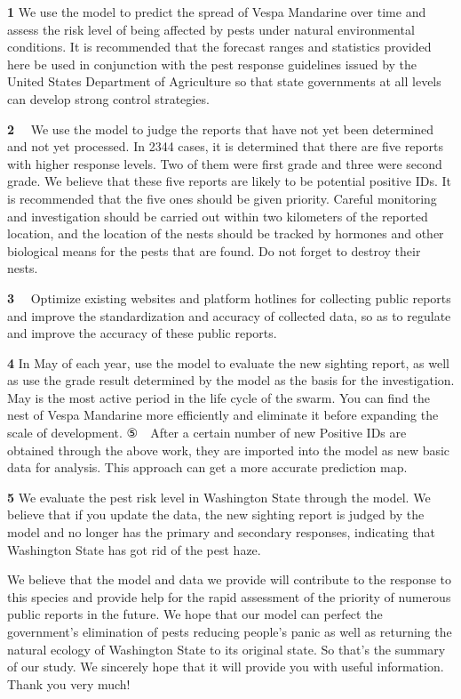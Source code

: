 \documentclass{mcmthesis}
\begin{document}
\textbf{1  } We use the model to predict the spread of Vespa Mandarine over time and assess the risk level of being affected by pests under natural environmental conditions. It is recommended that the forecast ranges and statistics provided here be used in conjunction with the pest response guidelines issued by the United States Department of Agriculture so that state governments at all levels can develop strong control strategies.

\textbf{2  } 　We use the model to judge the reports that have not yet been determined and not yet processed. In 2344 cases, it is determined that there are five reports with higher response levels. Two of them were first grade and three were second grade. We believe that these five reports are likely to be potential positive IDs. It is recommended that the five ones should be given priority. Careful monitoring and investigation should be carried out within two kilometers of the reported location, and the location of the nests should be tracked by hormones and other biological means for the pests that are found. Do not forget to destroy their nests.

\textbf{3  } 　Optimize existing websites and platform hotlines for collecting public reports and improve the standardization and accuracy of collected data, so as to regulate and improve the accuracy of these public reports.

\textbf{4  } In May of each year, use the model to evaluate the new sighting report, as well as use the grade result determined by the model as the basis for the investigation. May is the most active period in the life cycle of the swarm. You can find the nest of Vespa Mandarine more efficiently and eliminate it before expanding the scale of development.
⑤　After a certain number of new Positive IDs are obtained through the above work, they are imported into the model as new basic data for analysis. This approach can get a more accurate prediction map.

\textbf{5  } We evaluate the pest risk level in Washington State through the model. We believe that if you update the data, the new sighting report is judged by the model and no longer has the primary and secondary responses, indicating that Washington State has got rid of the pest haze.

We believe that the model and data we provide will contribute to the response to this species and provide help for the rapid assessment of the priority of numerous public reports in the future. We hope that our model can perfect the government's elimination of pests reducing people's panic as well as returning the natural ecology of Washington State to its original state. So that's the summary of our study. We sincerely hope that it will provide you with useful information. Thank you very much!
\end{document}
